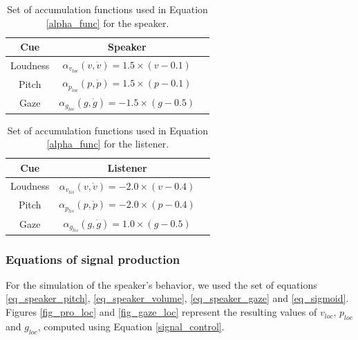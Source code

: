 
\begin{table}
\centering
\begin{tabular}{|c|c|c|}
\hline
Cue & Speaker \\
\hline
Loudness & $\alpha_{v_{loc}}(v,\dot{v})=1.5\times (v-0.1)$ \\
\hline
Pitch & $\alpha_{p_{loc}}(p,\dot{p})=1.5\times (p-0.1)$ \\
\hline
Gaze & $\alpha_{g_{loc}}(g,\dot{g})=-1.5\times (g-0.5)$ \\
\hline
\end{tabular}
\caption{Set of accumulation functions used in Equation \ref{alpha_func} for the speaker.}
\label{acc_functions_speaker}
\end{table}

\begin{table}
\centering
\begin{tabular}{|c|c|c|}
\hline
Cue & Listener \\
\hline
Loudness & $\alpha_{v_{lis}}(v,\dot{v})=-2.0\times (v-0.4)$ \\
\hline
Pitch & $\alpha_{p_{lis}}(p,\dot{p})=-2.0\times (p-0.4)$ \\
\hline
Gaze & $\alpha_{g_{lis}}(g,\dot{g})=1.0\times (g-0.5)$ \\
\hline
\end{tabular}
\caption{Set of accumulation functions used in Equation \ref{alpha_func} for the listener.}
\label{acc_functions_listener}
\end{table}

\subsubsection{Equations of signal production}

For the simulation of the speaker's behavior, we used the set of equations \ref{eq_speaker_pitch}, \ref{eq_speaker_volume}, \ref{eq_speaker_gaze} and \ref{eq_sigmoid}. Figures \ref{fig_pro_loc} and \ref{fig_gaze_loc} represent the resulting values of $v_{loc}$, $p_{loc}$ and $g_{loc}$, computed using Equation \ref{signal_control}.

